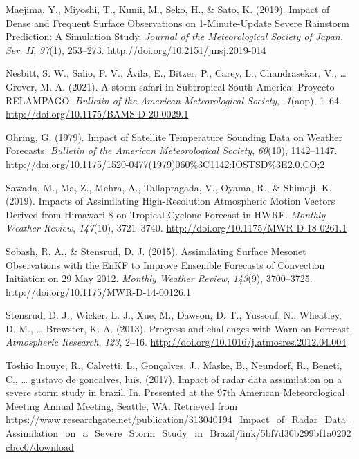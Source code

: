 \documentclass[12pt,twoside]{reedthesis}
\begin{document}
\leavevmode\hypertarget{ref-maejima2019}{}%
Maejima, Y., Miyoshi, T., Kunii, M., Seko, H., \& Sato, K. (2019). Impact of Dense and Frequent Surface Observations on 1-Minute-Update Severe Rainstorm Prediction: A Simulation Study. \emph{Journal of the Meteorological Society of Japan. Ser. II}, \emph{97}(1), 253--273. \url{http://doi.org/10.2151/jmsj.2019-014}

\leavevmode\hypertarget{ref-nesbitt2021}{}%
Nesbitt, S. W., Salio, P. V., Ávila, E., Bitzer, P., Carey, L., Chandrasekar, V., \ldots{} Grover, M. A. (2021). A storm safari in Subtropical South America: Proyecto RELAMPAGO. \emph{Bulletin of the American Meteorological Society}, \emph{-1}(aop), 1--64. \url{http://doi.org/10.1175/BAMS-D-20-0029.1}

\leavevmode\hypertarget{ref-ohring1979}{}%
Ohring, G. (1979). Impact of Satellite Temperature Sounding Data on Weather Forecasts. \emph{Bulletin of the American Meteorological Society}, \emph{60}(10), 1142--1147. \url{http://doi.org/10.1175/1520-0477(1979)060\%3C1142:IOSTSD\%3E2.0.CO;2}

\leavevmode\hypertarget{ref-sawada2019}{}%
Sawada, M., Ma, Z., Mehra, A., Tallapragada, V., Oyama, R., \& Shimoji, K. (2019). Impacts of Assimilating High-Resolution Atmospheric Motion Vectors Derived from Himawari-8 on Tropical Cyclone Forecast in HWRF. \emph{Monthly Weather Review}, \emph{147}(10), 3721--3740. \url{http://doi.org/10.1175/MWR-D-18-0261.1}

\leavevmode\hypertarget{ref-sobash2015}{}%
Sobash, R. A., \& Stensrud, D. J. (2015). Assimilating Surface Mesonet Observations with the EnKF to Improve Ensemble Forecasts of Convection Initiation on 29 May 2012. \emph{Monthly Weather Review}, \emph{143}(9), 3700--3725. \url{http://doi.org/10.1175/MWR-D-14-00126.1}

\leavevmode\hypertarget{ref-stensrud2013}{}%
Stensrud, D. J., Wicker, L. J., Xue, M., Dawson, D. T., Yussouf, N., Wheatley, D. M., \ldots{} Brewster, K. A. (2013). Progress and challenges with Warn-on-Forecast. \emph{Atmospheric Research}, \emph{123}, 2--16. \url{http://doi.org/10.1016/j.atmosres.2012.04.004}

\leavevmode\hypertarget{ref-toshioinouye2017}{}%
Toshio Inouye, R., Calvetti, L., Gonçalves, J., Maske, B., Neundorf, R., Beneti, C., \ldots{} gustavo de goncalves, luis. (2017). Impact of radar data assimilation on a severe storm study in brazil. In. Presented at the 97th American Meteorological Meeting Annual Meeting, Seattle, WA. Retrieved from \url{https://www.researchgate.net/publication/313040194_Impact_of_Radar_Data_Assimilation_on_a_Severe_Storm_Study_in_Brazil/link/5bf7d30b299bf1a0202cbcc0/download}
\end{document}
